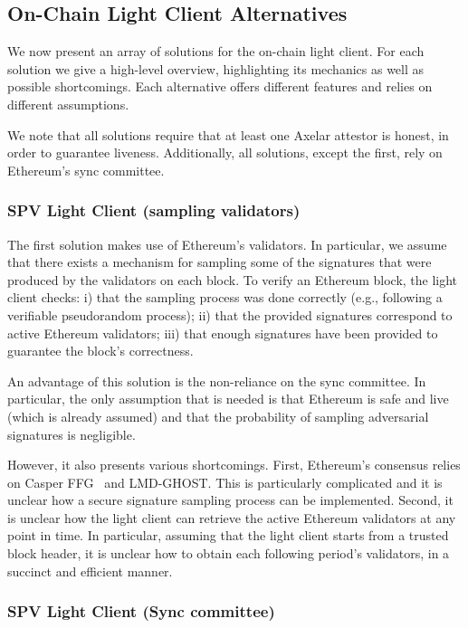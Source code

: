 \subsection{On-Chain Light Client Alternatives}\label{subsec:alternatives}

We now present an array of solutions for the on-chain light client. For each
solution we give a high-level overview, highlighting its mechanics as well as
possible shortcomings. Each alternative offers different features and relies on
different assumptions. 

We note that all solutions require that at least one Axelar attestor is honest,
in order to guarantee liveness. Additionally, all solutions, except the first,
rely on Ethereum's sync committee.

\subsubsection{SPV Light Client (sampling validators)}

The first solution makes use of Ethereum's validators. In particular, we assume
that there exists a mechanism for sampling some of the signatures that were
produced by the validators on each block. To verify an Ethereum block, the
light client checks:
i) that the sampling process was done correctly (e.g., following a verifiable pseudorandom process);
ii) that the provided signatures correspond to active Ethereum validators;
iii) that enough signatures have been provided to guarantee the block's correctness.

An advantage of this solution is the non-reliance on the sync committee. In
particular, the only assumption that is needed is that Ethereum is safe and
live (which is already assumed) and that the probability of sampling
adversarial signatures is negligible.

However, it also presents various shortcomings.
First, Ethereum's consensus relies on Casper FFG~\cite{buterin2017casper} and
LMD-GHOST. This is particularly complicated and it is unclear how a secure
signature sampling process can be implemented.
Second, it is unclear how the light client can retrieve the active Ethereum
validators at any point in time. In particular, assuming that the light client
starts from a trusted block header, it is unclear how to obtain each following
period's validators, in a succinct and efficient manner.

\subsubsection{SPV Light Client (Sync committee)}

